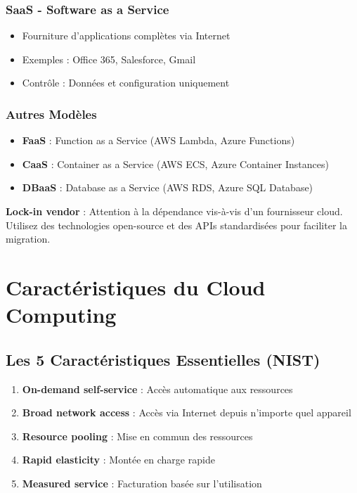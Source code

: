 \documentclass[11pt,a4paper]{article}
\begin{document}
\subsubsection{SaaS - Software as a Service}
\begin{itemize}
    \item Fourniture d'applications complètes via Internet
    \item Exemples : Office 365, Salesforce, Gmail
    \item Contrôle : Données et configuration uniquement
\end{itemize}

\subsubsection{Autres Modèles}
\begin{itemize}
    \item \textbf{FaaS} : Function as a Service (AWS Lambda, Azure Functions)
    \item \textbf{CaaS} : Container as a Service (AWS ECS, Azure Container Instances)
    \item \textbf{DBaaS} : Database as a Service (AWS RDS, Azure SQL Database)
\end{itemize}

\begin{dangerbox}
\textbf{Lock-in vendor} : Attention à la dépendance vis-à-vis d'un fournisseur cloud. Utilisez des technologies open-source et des APIs standardisées pour faciliter la migration.
\end{dangerbox}

\section{Caractéristiques du Cloud Computing}

\subsection{Les 5 Caractéristiques Essentielles (NIST)}

\begin{enumerate}
    \item \textbf{On-demand self-service} : Accès automatique aux ressources
    \item \textbf{Broad network access} : Accès via Internet depuis n'importe quel appareil
    \item \textbf{Resource pooling} : Mise en commun des ressources
    \item \textbf{Rapid elasticity} : Montée en charge rapide
    \item \textbf{Measured service} : Facturation basée sur l'utilisation
\end{enumerate}
\end{document}
